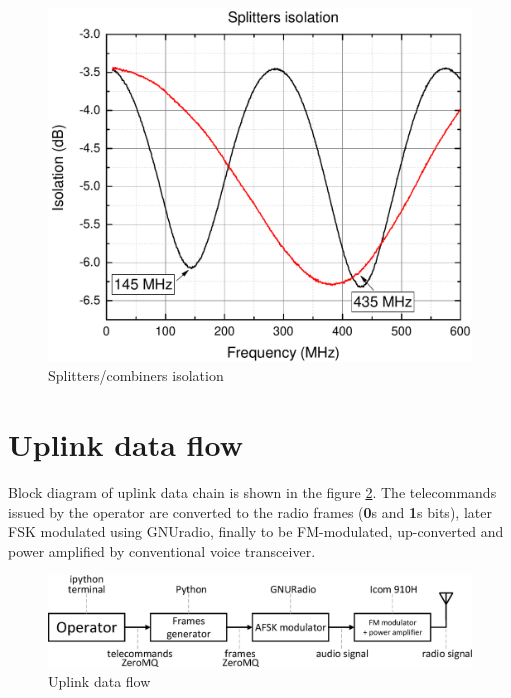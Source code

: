 \begin{figure}
    \centering
    \includegraphics[width=0.6\paperwidth]{img/5/splitter_isolation.pdf}
    \caption{Splitters/combiners isolation}
    \label{splitter_isolation}
\end{figure}




\section{Uplink data flow}
Block diagram of uplink data chain is shown in the figure \ref{uplink_data_flow}. The telecommands issued by the operator are converted to the radio frames (\textbf{0}s and \textbf{1}s bits), later FSK modulated using GNUradio, finally to be FM-modulated, up-converted and power amplified by conventional voice transceiver.

\begin{figure}
    \centering
    \includegraphics[width=0.6\paperwidth]{img/5/uplink_data_flow.eps}
    \caption{Uplink data flow}
    \label{uplink_data_flow}
\end{figure}

